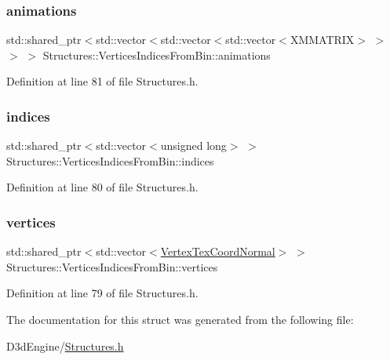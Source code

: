 \subsubsection{\texorpdfstring{animations}{animations}}
{\footnotesize\ttfamily std\+::shared\+\_\+ptr$<$std\+::vector$<$std\+::vector$<$std\+::vector$<$X\+M\+M\+A\+T\+R\+IX$>$ $>$ $>$ $>$ Structures\+::\+Vertices\+Indices\+From\+Bin\+::animations}



Definition at line 81 of file Structures.\+h.

\mbox{\label{struct_structures_1_1_vertices_indices_from_bin_ad211d683156331f097085628242c82a2}} 
\subsubsection{\texorpdfstring{indices}{indices}}
{\footnotesize\ttfamily std\+::shared\+\_\+ptr$<$std\+::vector$<$unsigned long$>$ $>$ Structures\+::\+Vertices\+Indices\+From\+Bin\+::indices}



Definition at line 80 of file Structures.\+h.

\mbox{\label{struct_structures_1_1_vertices_indices_from_bin_ae08d7d2a23d9103049738339cfe37728}} 
\subsubsection{\texorpdfstring{vertices}{vertices}}
{\footnotesize\ttfamily std\+::shared\+\_\+ptr$<$std\+::vector$<$\mbox{\hyperlink{struct_structures_1_1_vertex_tex_coord_normal}{Vertex\+Tex\+Coord\+Normal}}$>$ $>$ Structures\+::\+Vertices\+Indices\+From\+Bin\+::vertices}



Definition at line 79 of file Structures.\+h.



The documentation for this struct was generated from the following file\+:\begin{DoxyCompactItemize}
\item 
D3d\+Engine/\mbox{\hyperlink{_structures_8h}{Structures.\+h}}\end{DoxyCompactItemize}
